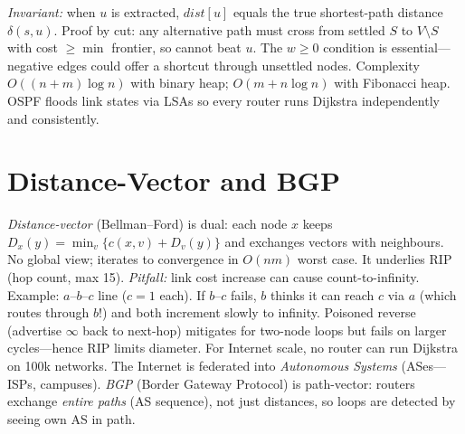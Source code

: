 \emph{Invariant:} when $u$ is extracted, $\mathit{dist}[u]$ equals the true shortest-path distance $\delta(s,u)$. Proof by cut: any alternative path must cross from settled $S$ to $V\setminus S$ with cost $\ge \min$ frontier, so cannot beat $u$. The $w\ge0$ condition is essential---negative edges could offer a shortcut through unsettled nodes. Complexity $O((n+m)\log n)$ with binary heap; $O(m+n\log n)$ with Fibonacci heap. OSPF floods link states via LSAs so every router runs Dijkstra independently and consistently.
\section{Distance-Vector and BGP}\label{sec:dv-bgp}
\emph{Distance-vector} (Bellman--Ford) is dual: each node $x$ keeps $D_x(y)=\min_v\{c(x,v)+D_v(y)\}$ and exchanges vectors with neighbours. No global view; iterates to convergence in $O(nm)$ worst case. It underlies RIP (hop count, max 15).
\emph{Pitfall:} link cost increase can cause count-to-infinity. Example: $a$--$b$--$c$ line ($c=1$ each). If $b$--$c$ fails, $b$ thinks it can reach $c$ via $a$ (which routes through $b$!) and both increment slowly to infinity. Poisoned reverse (advertise $\infty$ back to next-hop) mitigates for two-node loops but fails on larger cycles---hence RIP limits diameter.
For Internet scale, no router can run Dijkstra on 100k networks. The Internet is federated into \emph{Autonomous Systems} (ASes---ISPs, campuses). \emph{BGP} (Border Gateway Protocol) is path-vector: routers exchange \emph{entire paths} (AS sequence), not just distances, so loops are detected by seeing own AS in path.
